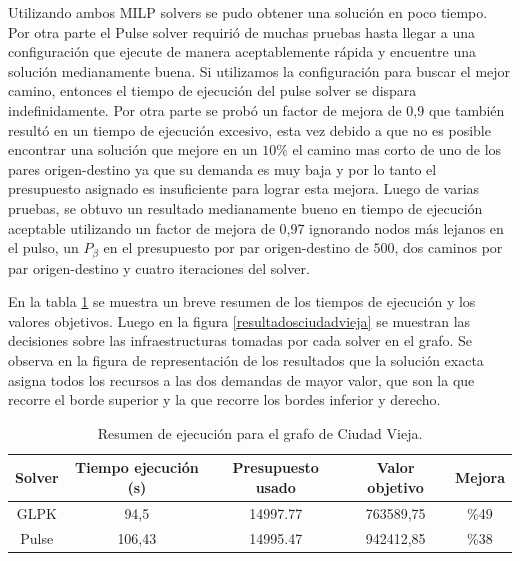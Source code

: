 \documentclass{article}
\begin{document}
  Utilizando ambos MILP solvers se pudo obtener una solución en poco tiempo. Por otra parte el Pulse solver requirió de muchas pruebas hasta llegar a una configuración que ejecute de manera aceptablemente rápida y encuentre una solución medianamente buena. Si utilizamos la configuración para buscar el mejor camino, entonces el tiempo de ejecución del pulse solver se dispara indefinidamente. Por otra parte se probó un factor de mejora de 0,9 que también resultó en un tiempo de ejecución excesivo, esta vez debido a que no es posible encontrar una solución que mejore en un $10\%$ el camino mas corto de uno de los pares origen-destino ya que su demanda es muy baja y por lo tanto el presupuesto asignado es insuficiente para lograr esta mejora. Luego de varias pruebas, se obtuvo un resultado medianamente bueno en tiempo de ejecución aceptable utilizando un factor de mejora de 0,97 ignorando nodos más lejanos en el pulso, un $P_{\beta}$ en el presupuesto por par origen-destino de $500$, dos caminos por par origen-destino y cuatro iteraciones del solver.
  
  En la tabla \ref{table:resultadosciudadvieja} se muestra un breve resumen de los tiempos de ejecución y los valores objetivos. Luego en la figura \ref{resultadosciudadvieja} se muestran las decisiones sobre las infraestructuras tomadas por cada solver en el grafo. Se observa en la figura de representación de los resultados que la solución exacta asigna todos los recursos a las dos demandas de mayor valor, que son la que recorre el borde superior y la que recorre los bordes inferior y derecho.

  \begin{table}[h!]
    \centering
    \begin{tabular}{ccccc}
      \toprule
      Solver & Tiempo ejecución (s) & Presupuesto usado & Valor objetivo & Mejora \\
      \midrule
      GLPK  & 94,5   & 14997.77 & 763589,75 & \%49 \\
      Pulse & 106,43 & 14995.47 & 942412,85 & \%38 \\
      \bottomrule
    \end{tabular}
    \caption{Resumen de ejecución para el grafo de Ciudad Vieja.}\label{table:resultadosciudadvieja}
  \end{table}
\end{document}
